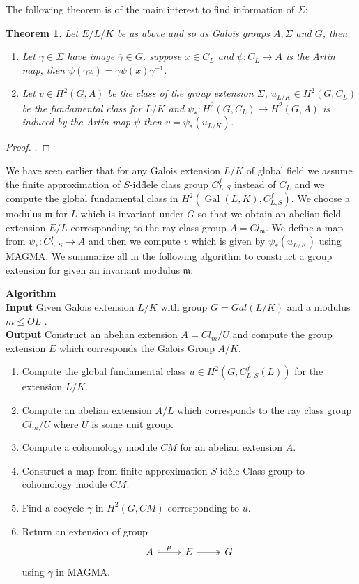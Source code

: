 \documentclass{article}
\theoremstyle{break}
\newtheorem{theorem}{Theorem}[section]
\def\Gal{\mathop{\mathrm{Gal}}\nolimits}
\def\Gal{\mathop{\mathrm{Gal}}\nolimits}
\def\Gal{\mathop{\mathrm{Gal}}\nolimits}
\def\m{\mathfrak{m}}
\begin{document}
The following theorem is of the main interest to find information of $\Sigma$:
\begin{theorem}
Let $E/L/K$ be as above and so as Galois groups $A,\Sigma$ and $G$, then
\begin{enumerate}
\item Let $\gamma \in \Sigma$ have image $\overline{\gamma} \in G$. suppose $x \in C_{L}$ and $\psi: C_{L}\rightarrow A$ is the Artin map, then $\psi(\overline{\gamma}x)= \gamma \psi(x) \gamma^{-1}$.
\item Let $v \in H^{2}(G,A)$ be the class of the group extension $\Sigma$, $u_{L/K} \in H^2(G,C_L)$ be the fundamental class for $L/K$ and $\psi_{*}: H^2(G,C_L) \rightarrow H^2(G,A) $ is induced by the Artin map $\psi$ then $v= \psi_{*}(u_{L/K})$.
\end{enumerate}
\end{theorem}
\begin{proof}
\cite{Cassels}.
\end{proof}
We have seen earlier that for any Galois extension $L/K$ of global field we assume the finite approximation of $S$-id\`dele class group $C_{L,S}^{f}$ instead of $C_L$ and we compute the global fundamental class in $H^{2}(\Gal(L,K), C_{L,S}^{f})$. We choose a modulus $\mathfrak{m}$ for $L$ which is invariant under $G$ so that we obtain an abelian field extension $E/L$ corresponding to the ray class group $A=Cl_{\m}$. We define a map from $\psi_{*}:C_{L,S}^{f} \rightarrow A$
and then we compute  $v$ which is given by $\psi_{*}(u_{L/K}) $ using MAGMA. We summarize all in the following algorithm to construct a group extension for given an invariant modulus $\m$:


\textbf{Algorithm}\\
\textbf{Input} Given Galois extension $L/K$ with group $G=Gal(L/K)$ and a modulus $m \leq OL$ .\\%
\textbf{Output} Construct an abelian extension $A=Cl_{m}/U$ and compute the group extension $E$ which corresponds the Galois Group $A/K$.
\begin{enumerate}
\item Compute the global fundamental class $u\in H^{2}(G, C_{L,S}^{f}(L))$ for the extension $L/K$.
\item Compute an abelian extension $A/L$ which corresponds to the ray class group $Cl_{m}/U$ where $U$ is some unit group.%
\item Compute a cohomology module $CM$ for an abelian extension $A$. 
\item Construct a map from finite approximation $S$-id\`ele Class group to cohomology module $CM$.
\item  Find a cocycle $\gamma$ in $H^{2}(G, CM)$ corresponding to $u$.
\item Return an extension of group
\[
\begin{tikzcd} A\arrow[hookrightarrow]{r}{\mu}&  E  \arrow[two heads]{r} & G  
\end{tikzcd}
\]
using $\gamma$ in MAGMA. 
\end{enumerate}
\end{document}
